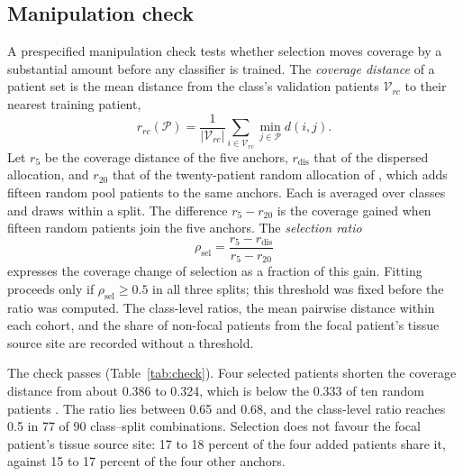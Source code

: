 \documentclass[11pt]{article}
\begin{document}
\subsection{Manipulation check}
\label{sec:manipulation}
A prespecified manipulation check tests whether selection moves coverage by a substantial amount before any classifier is trained. The \emph{coverage distance} of a patient set is the mean distance from the class's validation patients $\mathcal V_{rc}$ to their nearest training patient,
\begin{equation}
 r_{rc}(\mathcal P)=\frac{1}{|\mathcal V_{rc}|}\sum_{i\in\mathcal V_{rc}}\min_{j\in\mathcal P}d(i,j).
 \label{eq:coverage}
\end{equation}
\noindent Let $r_{5}$ be the coverage distance of the five anchors, $r_{\mathrm{dis}}$ that of the dispersed allocation, and $r_{20}$ that of the twenty-patient random allocation of \citet{queisler2026cohortComposition}, which adds fifteen random pool patients to the same anchors. Each is averaged over classes and draws within a split. The difference $r_{5}-r_{20}$ is the coverage gained when fifteen random patients join the five anchors. The \emph{selection ratio}
\begin{equation}
 \rho_{\mathrm{sel}}=\frac{r_{5}-r_{\mathrm{dis}}}{r_{5}-r_{20}}
 \label{eq:ratio}
\end{equation}
\noindent expresses the coverage change of selection as a fraction of this gain. Fitting proceeds only if $\rho_{\mathrm{sel}}\ge 0.5$ in all three splits; this threshold was fixed before the ratio was computed. The class-level ratios, the mean pairwise distance within each cohort, and the share of non-focal patients from the focal patient's tissue source site are recorded without a threshold.

The check passes (Table~\ref{tab:check}). Four selected patients shorten the coverage distance from about 0.386 to 0.324, which is below the 0.333 of ten random patients \citep{queisler2026coverageRedundancy}. The ratio lies between 0.65 and 0.68, and the class-level ratio reaches 0.5 in 77 of 90 class--split combinations. Selection does not favour the focal patient's tissue source site: 17 to 18 percent of the four added patients share it, against 15 to 17 percent of the four other anchors.
\end{document}
